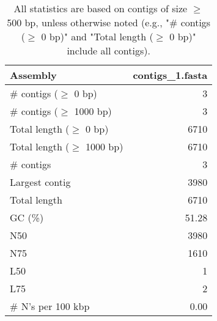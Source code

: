 \documentclass[12pt,a4paper]{article}
\begin{document}
\begin{table}[ht]
\begin{center}
\caption{All statistics are based on contigs of size $\geq$ 500 bp, unless otherwise noted (e.g., "\# contigs ($\geq$ 0 bp)" and "Total length ($\geq$ 0 bp)" include all contigs).}
\begin{tabular}{|l*{1}{|r}|}
\hline
Assembly & contigs\_1.fasta \\ \hline
\# contigs ($\geq$ 0 bp) & 3 \\ \hline
\# contigs ($\geq$ 1000 bp) & 3 \\ \hline
Total length ($\geq$ 0 bp) & 6710 \\ \hline
Total length ($\geq$ 1000 bp) & 6710 \\ \hline
\# contigs & 3 \\ \hline
Largest contig & 3980 \\ \hline
Total length & 6710 \\ \hline
GC (\%) & 51.28 \\ \hline
N50 & 3980 \\ \hline
N75 & 1610 \\ \hline
L50 & 1 \\ \hline
L75 & 2 \\ \hline
\# N's per 100 kbp & 0.00 \\ \hline
\end{tabular}
\end{center}
\end{table}
\end{document}
